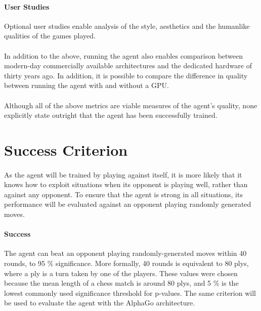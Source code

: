 \documentclass[a4paper]{article}
\begin{document}
\paragraph{User Studies} Optional user studies enable analysis of the style, aesthetics and the humanlike qualities of the games played.

\paragraph{} In addition to the above, running the agent also enables comparison between modern-day commercially available architectures and the dedicated hardware of thirty years ago. In addition, it is possible to compare the difference in quality between running the agent with and without a GPU.

\paragraph{} Although all of the above metrics are viable measures of the agent's quality, none explicitly state outright that the agent has been successfully trained.


\section*{Success Criterion}

\paragraph{} As the agent will be trained by playing against itself, it is more likely that it knows how to exploit situations when its opponent is playing well, rather than against any opponent. To ensure that the agent is strong in all situations, its performance will be evaluated against an opponent playing randomly generated moves.

\paragraph{Success} The agent can beat an opponent playing randomly-generated moves within 40 rounds, to 95 \% significance. More formally, 40 rounds is equivalent to 80 plys, where a ply is a turn taken by one of the players. These values were chosen because the mean length of a chess match is around 80 plys, and 5 \% is the lowest commonly used significance threshold for p-values. The same criterion will be used to evaluate the agent with the AlphaGo architecture.
\end{document}
